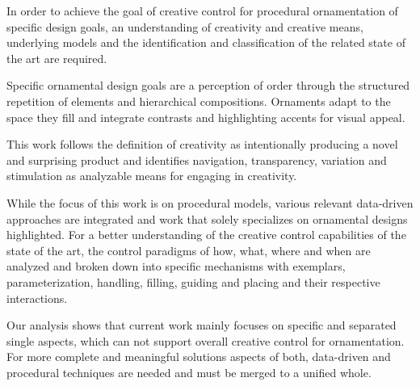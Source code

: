 In order to achieve the  goal of creative control for procedural ornamentation of specific design goals, an understanding of creativity and creative means, underlying models and the identification and classification of the related state of the art are required.

Specific ornamental design goals are a perception of order through the structured repetition of elements and hierarchical compositions. Ornaments adapt to the space they fill and integrate  contrasts and highlighting accents for visual appeal.

This work follows the definition of creativity as intentionally producing a novel and surprising product and identifies navigation, transparency, variation and stimulation as analyzable means for engaging in creativity.

While the focus of this work is on procedural models, various relevant data-driven approaches are integrated and work that solely specializes on ornamental designs highlighted. For a better understanding of the creative control capabilities of the state of the art, the control paradigms of how, what, where and when are analyzed and broken down into specific mechanisms with exemplars, parameterization, handling, filling, guiding and placing and their respective interactions.

Our analysis shows that current work mainly focuses on specific and separated single aspects, which can not support overall creative control for ornamentation. For more complete and meaningful solutions aspects of both, data-driven and procedural techniques are needed and must be merged to a unified whole.



